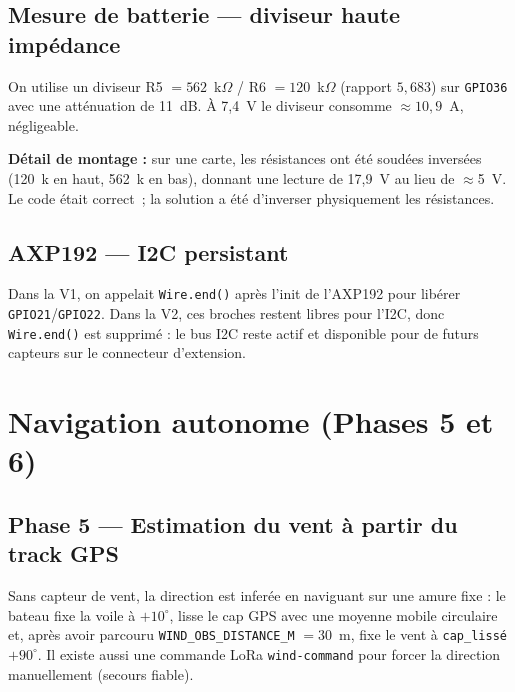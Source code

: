 \documentclass[12pt,a4paper]{article}
\newcommand{\gpio}[1]{\texttt{GPIO#1}}
\begin{document}
\subsection{Mesure de batterie --- diviseur haute imp\'edance}

On utilise un diviseur R5 $=562$~k$\Omega$ / R6 $=120$~k$\Omega$ (rapport $5{,}683$)
sur \gpio{36} avec une att\'enuation de 11~dB. À 7,4~V le diviseur consomme
$\approx10{,}9$~\textmu A, n\'egligeable.

\begin{warningbox}
  \textbf{D\'etail de montage :} sur une carte, les r\'esistances ont \'et\'e
  soud\'ees invers\'ees (120~k en haut, 562~k en bas), donnant une lecture de 17,9~V
  au lieu de $\approx$5~V. Le code \'etait correct~; la solution a \'et\'e d'inverser
  physiquement les r\'esistances.
\end{warningbox}

\subsection{AXP192 --- I2C persistant}

Dans la V1, on appelait \texttt{Wire.end()} apr\`es l'init de l'AXP192 pour lib\'erer
\gpio{21}/\gpio{22}. Dans la V2, ces broches restent libres pour l'I2C, donc
\texttt{Wire.end()} est supprim\'e : le bus I2C reste actif et disponible pour de
futurs capteurs sur le connecteur d'extension.

\section{Navigation autonome (Phases 5 et 6)}

\subsection{Phase 5 --- Estimation du vent à partir du track GPS}

Sans capteur de vent, la direction est infer\'ee en naviguant sur une amure fixe : le
bateau fixe la voile à $+10^{\circ}$, lisse le cap GPS avec une moyenne mobile
circulaire et, apr\`es avoir parcouru \texttt{WIND\_OBS\_DISTANCE\_M} $=30$~m, fixe
le vent à \texttt{cap\_liss\'e $+ 90^{\circ}$}. Il existe aussi une commande LoRa
\texttt{wind-command} pour forcer la direction manuellement (secours fiable).
\end{document}
